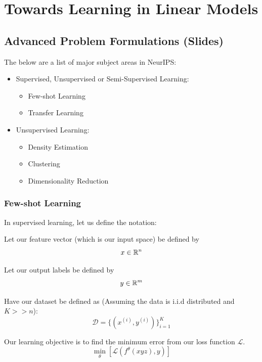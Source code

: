 \chapter{Towards Learning in Linear Models}

\section{Advanced Problem Formulations (Slides)}

The below are a list of major subject areas in NeurIPS:
\begin{itemize}[noitemsep]
    \item Supervised, Unsupervised or Semi-Supervised Learning:
    \begin{itemize}[noitemsep]
        \item Few-shot Learning
        \item Transfer Learning
    \end{itemize}
    \item Unsupervised Learning:
    \begin{itemize}[noitemsep]
        \item Density Estimation
        \item Clustering
        \item Dimensionality Reduction
    \end{itemize}
\end{itemize}


\subsection{Few-shot Learning}

In supervised learning, let us define the notation:

\noindent Let our feature vector (which is our input space) be defined by
\begin{equation}
    x \in \mathbb{R}^n
\end{equation}

\noindent Let our output labels be defined by
\begin{equation}
    y \in \mathbb{R}^m
\end{equation}

\noindent  Have our dataset be defined as (Assuming the data is i.i.d distributed and  $K >> n$):
\begin{equation}
    \mathcal{D} = \{(x^{(i)}, y^{(i)})\}_{i=1}^K 
\end{equation}

Our learning objective is to find the minimum error from our loss function $\mathcal{L}$.
\begin{equation}
    \min_\theta \left[ \mathcal{L}(f^\theta(xyz),y) \right]
\end{equation}

